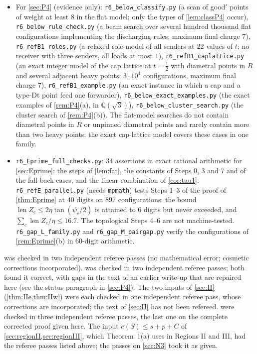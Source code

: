 \documentclass[11pt]{amsart}
\theoremstyle{definition}
\theoremstyle{remark}
\begin{document}
\begin{itemize}[leftmargin=2em]
\item For \cref{sec:P4} (evidence only): \texttt{r6\_below\_classify.py} (a scan of good$'$ points of weight at least $8$ in the flat model; only the types of \cref{lem:classP4} occur), \texttt{r6\_below\_rule\_check.py} (a beam search over several hundred thousand flat configurations implementing the discharging rules; maximum final charge $7$), \texttt{r6\_refB1\_roles.py} (a relaxed role model of all senders at $22$ values of $t$; no receiver with three senders, all loads at most $1$), \texttt{r6\_refB1\_caplattice.py} (an exact integer model of the cap lattice at $t=\frac12$ with diametral points in $R$ and several adjacent heavy points; $3\cdot10^4$ configurations, maximum final charge $7$), \texttt{r6\_refB1\_example.py} (an exact instance in which a cap and a type-Dt point feed one forwarder), \texttt{r6\_below\_exact\_examples.py} (the exact examples of \cref{rem:P4}(a), in $\mathbb Q(\sqrt3)$), \texttt{r6\_below\_cluster\_search.py} (the cluster search of \cref{rem:P4}(b)). The flat-model searches do not contain diametral points in $R$ or unpinned diametral points and rarely contain more than two heavy points; the exact cap-lattice model covers these cases in one family.
\item \texttt{r6\_Eprime\_full\_checks.py}: 34 assertions in exact rational arithmetic for \cref{sec:Eprime}: the steps of \cref{lem:fat}, the constants of Steps 0, 3 and 7 and of the fall-back cases, and the linear combination of \cref{cor:tau1}. \texttt{r6\_refE\_parallel.py} (needs \texttt{mpmath}) tests Steps 1--3 of the proof of \cref{thm:Eprime} at $40$ digits on $897$ configurations: the bound $\operatorname{len}Z_c\le2\eta\tan(\psi_c/2)$ is attained to $6$ digits but never exceeded, and $\sum_c\operatorname{len}Z_c/\eta\le16.7$. The topological Steps 4--6 are not machine-tested. \texttt{r6\_gap\_L\_family.py} and \texttt{r6\_gap\_M\_pairgap.py} verify the configurations of \cref{rem:Eprime}(b) in $60$-digit arithmetic.
\end{itemize}
 was checked in two independent referee passes (no mathematical error; cosmetic corrections incorporated).  was checked in two independent referee passes; both found it correct, with gaps in the text of an earlier write-up that are repaired here (see the status paragraph in \cref{sec:P4}). The two inputs of \cref{sec:II} (\cref{thm:IIe,thm:IIw}) were each checked in one independent referee pass, whose corrections are incorporated; the text of \cref{sec:II} has not been refereed.  were checked in three independent referee passes, the last one on the complete corrected proof given here. The input $e(S)\le s+p+C$ of \cref{sec:regionII,sec:regionIII}, which Theorem~1(a) uses in Regions II and III, had the referee passes listed above; the passes on \cref{sec:N3} took it as given.
\end{document}
